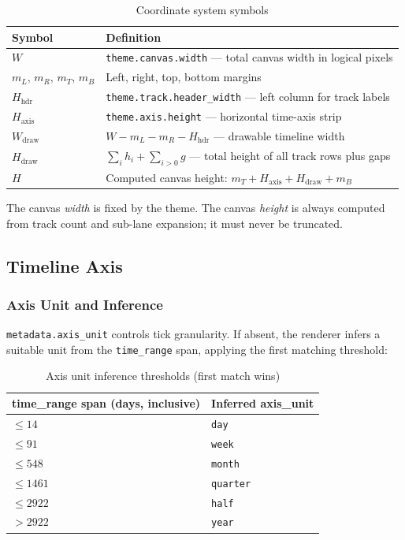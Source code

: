 \begin{table}[h]
\centering
\small
\begin{tabular}{lp{9.5cm}}
\toprule
\textbf{Symbol} & \textbf{Definition} \\
\midrule
$W$ & \texttt{theme.canvas.width} --- total canvas width in logical pixels \\
$m_L,\,m_R,\,m_T,\,m_B$ & Left, right, top, bottom margins \\
$H_{\mathrm{hdr}}$ & \texttt{theme.track.header\_width} --- left column for track labels \\
$H_{\mathrm{axis}}$ & \texttt{theme.axis.height} --- horizontal time-axis strip \\
$W_{\mathrm{draw}}$ & $W - m_L - m_R - H_{\mathrm{hdr}}$ --- drawable timeline width \\
$H_{\mathrm{draw}}$ & $\displaystyle\sum_{i} h_i + \sum_{i>0} g$ --- total height of all track rows plus gaps \\
$H$ & Computed canvas height: $m_T + H_{\mathrm{axis}} + H_{\mathrm{draw}} + m_B$ \\
\bottomrule
\end{tabular}
\caption{Coordinate system symbols}
\label{tab:coord-symbols}
\end{table}

The canvas \emph{width} is fixed by the theme. The canvas \emph{height} is always computed
from track count and sub-lane expansion; it must never be truncated.

\subsection{Timeline Axis}
\label{sec:rendering-axis}

\subsubsection{Axis Unit and Inference}
\label{sec:axis-inference}

\texttt{metadata.axis\_unit} controls tick granularity. If absent, the renderer infers a
suitable unit from the \texttt{time\_range} span, applying the first matching threshold:

\begin{table}[h]
\centering
\begin{tabular}{ll}
\toprule
\textbf{time\_range span (days, inclusive)} & \textbf{Inferred axis\_unit} \\
\midrule
$\leq 14$  & \texttt{day}     \\
$\leq 91$  & \texttt{week}    \\
$\leq 548$ & \texttt{month}   \\
$\leq 1461$& \texttt{quarter} \\
$\leq 2922$& \texttt{half}    \\
$> 2922$   & \texttt{year}    \\
\bottomrule
\end{tabular}
\caption{Axis unit inference thresholds (first match wins)}
\label{tab:axis-inference}
\end{table}

